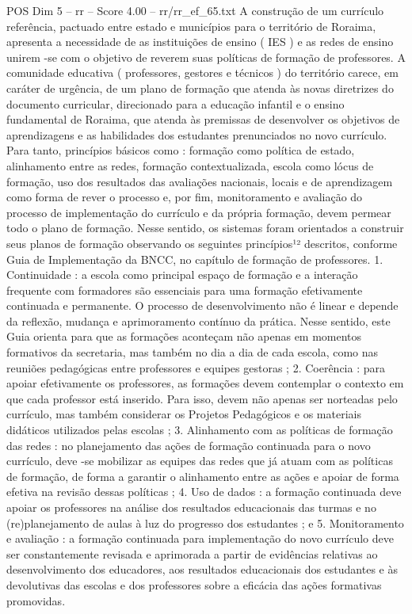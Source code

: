 \begin{textsample}{POS Dim 5 – rr – Score 4.00 – rr/rr\_ef\_65.txt}
A construção de um currículo referência, pactuado entre estado e municípios para o território de Roraima, apresenta a necessidade de as instituições de ensino ( IES ) e as redes de ensino unirem -se com o objetivo de reverem suas políticas de formação de professores.
A comunidade educativa ( professores, gestores e técnicos ) do território carece, em caráter de urgência, de um plano de formação que atenda às novas diretrizes do documento curricular, direcionado para a educação infantil e o ensino fundamental de Roraima, que atenda às premissas de desenvolver os objetivos de aprendizagens e as habilidades dos estudantes prenunciados no novo currículo.
Para tanto, princípios básicos como : formação como política de estado, alinhamento entre as redes, formação contextualizada, escola como lócus de formação, uso dos resultados das avaliações nacionais, locais e de aprendizagem como forma de rever o processo e, por fim, monitoramento e avaliação do processo de implementação do currículo e da própria formação, devem permear todo o plano de formação.
Nesse sentido, os sistemas foram orientados a construir seus planos de formação observando os seguintes princípios¹² descritos, conforme Guia de Implementação da BNCC, no capítulo de formação de professores. 1.
Continuidade : a escola como principal espaço de formação e a interação frequente com formadores são essenciais para uma formação efetivamente continuada e permanente.
O processo de desenvolvimento não é linear e depende da reflexão, mudança e aprimoramento contínuo da prática.
Nesse sentido, este Guia orienta para que as formações aconteçam não apenas em momentos formativos da secretaria, mas também no dia a dia de cada escola, como nas reuniões pedagógicas entre professores e equipes gestoras ; 2.
Coerência : para apoiar efetivamente os professores, as formações devem contemplar o contexto em que cada professor está inserido.
Para isso, devem não apenas ser norteadas pelo currículo, mas também considerar os Projetos Pedagógicos e os materiais didáticos utilizados pelas escolas ; 3.
Alinhamento com as políticas de formação das redes : no planejamento das ações de formação continuada para o novo currículo, deve -se mobilizar as equipes das redes que já atuam com as políticas de formação, de forma a garantir o alinhamento entre as ações e apoiar de forma efetiva na revisão dessas políticas ; 4.
Uso de dados : a formação continuada deve apoiar os professores na análise dos resultados educacionais das turmas e no (re)planejamento de aulas à luz do progresso dos estudantes ; e 5.
Monitoramento e avaliação : a formação continuada para implementação do novo currículo deve ser constantemente revisada e aprimorada a partir de evidências relativas ao desenvolvimento dos educadores, aos resultados educacionais dos estudantes e às devolutivas das escolas e dos professores sobre a eficácia das ações formativas promovidas.

\end{textsample}
